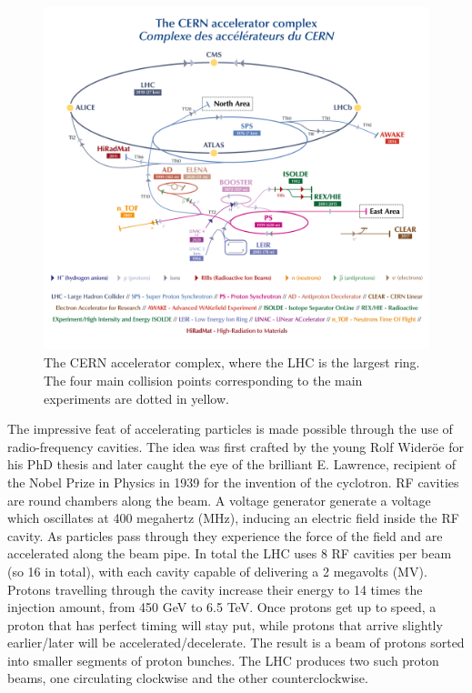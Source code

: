 \begin{figure}
  \includegraphics[width=\mediumfigwidth]{Figures/LHC/CernAcceleratorComplex.png}
  \caption[The \CERN accelerator complex]%
  {The CERN accelerator complex, where the LHC is the largest ring. The four main collision points corresponding to the main experiments are dotted in yellow.}
  \label{fig:CERNComplex}
\end{figure}

The impressive feat of accelerating particles is made possible through the use of radio-frequency cavities. The idea was first crafted by the young Rolf Wideröe \cite{Vretenar:2012}  for his PhD thesis and later caught the eye of the brilliant E. Lawrence, recipient of the Nobel Prize in Physics in 1939 for the invention of the cyclotron. RF cavities are round chambers along the beam. A voltage generator generate a voltage which oscillates at 400 megahertz (MHz), inducing an electric field inside the RF cavity. As particles pass through they experience the force of the field and are accelerated along the beam pipe. In total the LHC uses 8 RF cavities per beam (so 16 in total), with each cavity capable of delivering a 2 megavolts (MV). Protons travelling through the cavity increase their energy to 14 times the injection amount, from 450 GeV to 6.5 TeV. Once protons get up to speed, a proton that has perfect timing will stay put, while protons that arrive slightly earlier/later will be accelerated/decelerate. The result is a beam of protons sorted into smaller segments of proton bunches. The LHC produces two such proton beams, one circulating clockwise and the other counterclockwise. 

